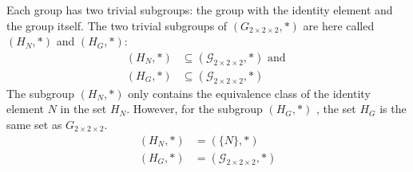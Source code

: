 \documentclass[12pt,a4paper]{article}
\theoremstyle{custom}
\newcommand{\Gtwo}{\ensuremath{G_{2\times 2\times 2}}}
\begin{document}
Each group has two trivial subgroups: the group with the identity element and the group itself.  The two trivial subgroups of $(\Gtwo, \scriptstyle *)$ are here called $(H_N, \scriptstyle *)$ and $(H_G, \scriptstyle *)$:
\begin{align*}
(H_N, \scriptstyle*) &\subseteq (\mathcal{G}_{2 \times 2 \times 2}, \scriptstyle *) \text{ and } \\
(H_G, \scriptstyle*) &\subseteq (\mathcal{G}_{2 \times 2 \times 2}, \scriptstyle *)
\end{align*}
The subgroup $\left(H_N, \scriptstyle*\right)$
 only contains the equivalence class of the identity element $N$ in the set $H_N$. However, for the subgroup $\left(H_G, \scriptstyle*\right)$
, the  set $H_G$ is the same set as $\Gtwo$.
\begin{align*}
(H_N, \scriptstyle*) &= (\{N\}, \scriptstyle*)  \\
(H_G, \scriptstyle*) &= (\mathcal{G}_{2 \times 2 \times 2}, \scriptstyle*)
\end{align*}
\end{document}
